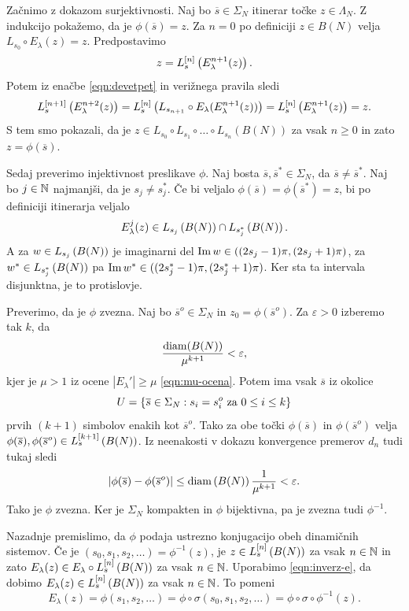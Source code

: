 \begin{dokaz}
    Začnimo z dokazom surjektivnosti. Naj bo \(\overline{s} \in \Sigma_N\) itinerar točke \(z \in \Lambda_N\). Z indukcijo pokažemo, da je \(\phi (\overline{s}) = z\). Za \(n = 0\) po definiciji \(z \in B (N)\) velja \(L_{s_0} \circ E_\lambda (z) = z\). Predpostavimo
    \[z = L_{s}^{[n]} \left( E_{\lambda}^{n + 1} (z) \right).\]
    Potem iz enačbe \eqref{eqn:devetpet} in verižnega pravila sledi
    \[L_{s}^{[n + 1]} \left( E_{\lambda}^{n + 2} (z) \right) = L_{s}^{[n]} \left( L_{s_{n + 1}} \circ E_\lambda (E_\lambda^{n + 1} (z)) \right) = L_{s}^{[n]} \left( E_\lambda^{n + 1} (z) \right) = z.\]
    S tem smo pokazali, da je \(z \in L_{s_0} \circ L_{s_1} \circ \dots \circ L_{s_n} (B (N))\) za vsak \(n \geq 0\) in zato \(z = \phi (\overline{s})\).

    Sedaj preverimo injektivnost preslikave \(\phi\). Naj bosta \(\overline{s}, \overline{s}^* \in \Sigma_N\), da \(\overline{s} \neq \overline{s}^*\). Naj bo \(j \in \mathbb N\) najmanjši, da je \(s_j \neq s_j^*\). Če bi veljalo \(\phi (\overline{s}) = \phi (\overline{s}^*) = z\), bi po definiciji itinerarja veljalo
    \[E_\lambda^j (z)\in L_{s_j} \left( B (N) \right) \cap L_{s_j^*} \left( B (N) \right).\]
    A za \(w \in L_{s_j} \left( B (N) \right)\) je imaginarni del \(\operatorname{Im} w \in ((2 s_j - 1) \pi, (2 s_j + 1) \pi)\), za \(w^* \in L_{s_j^*} \left( B (N) \right)\) pa \(\operatorname{Im} w^* \in ((2 s_j^* - 1) \pi, (2 s_j^* + 1) \pi)\). Ker sta ta intervala disjunktna, je to protislovje.

    Preverimo, da je \(\phi\) zvezna. Naj bo \(\overline{s}^o \in \Sigma_N\) in \(z_0 = \phi (\overline{s}^o)\). Za \(\varepsilon > 0\) izberemo tak \(k\), da
    \[\frac{\operatorname{diam} (B (N))}{\mu^{k + 1}} < \varepsilon,\]
    kjer je \(\mu > 1\) iz ocene \(|E_\lambda'| \geq \mu\) \eqref{eqn:mu-ocena}. Potem ima vsak \(\overline{s}\) iz okolice
    \[U = \left\{ \overline{s} \in \Sigma_N : s_i = s_i^o \text{ za } 0 \leq i \leq k \right\}\]
    prvih \((k + 1)\) simbolov enakih kot \(\overline{s}^o\). Tako za obe točki \(\phi (\overline{s})\) in \(\phi (\overline{s}^o)\) velja \(\phi (\overline{s}), \phi (\overline{s}^o) \in L_s^{[k + 1]} \left( B (N) \right)\). Iz neenakosti v dokazu konvergence premerov \(d_n\) tudi tukaj sledi
    \[\left| \phi (\overline{s}) - \phi (\overline{s}^o) \right| \leq \operatorname{diam} \left( B (N) \right) \frac{1}{\mu^{k + 1}} < \varepsilon.\]
    Tako je \(\phi\) zvezna. Ker je \(\Sigma_N\) kompakten in \(\phi\) bijektivna, pa je zvezna tudi \(\phi^{-1}\).

    Nazadnje premislimo, da \(\phi\) podaja ustrezno konjugacijo obeh dinamičnih sistemov. Če je \((s_0, s_1, s_2, \dots) = \phi^{-1} (z)\), je \(z \in L_s^{[n]} \left( B (N) \right)\) za vsak \(n \in \mathbb N\) in zato \(E_\lambda (z) \in E_\lambda \circ L_s^{[n]} \left( B (N) \right)\) za vsak \(n \in \mathbb N\). Uporabimo \eqref{eqn:inverz-e}, da dobimo \(E_\lambda (z) \in L_s^{[n]} \left( B (N) \right)\) za vsak \(n \in \mathbb N\). To pomeni
    \[E_\lambda (z) = \phi (s_1, s_2, \dots) = \phi \circ \sigma (s_0, s_1, s_2, \dots) = \phi \circ \sigma \circ \phi^{-1} (z).\]
\end{dokaz}

